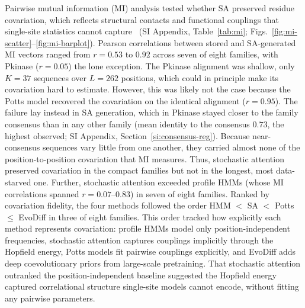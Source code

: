 Pairwise mutual information (MI) analysis tested whether SA preserved residue covariation, which reflects structural contacts and functional couplings that single-site statistics cannot capture~\cite{morcosDirectCouplingAnalysis2011} (SI Appendix, Table~\ref{tab:mi}; Figs.~\ref{fig:mi-scatter}--\ref{fig:mi-barplot}). Pearson correlations between stored and SA-generated MI vectors ranged from $r{=}0.53$ to $0.92$ across seven of eight families, with Pkinase ($r{=}0.05$) the lone exception. The Pkinase alignment was shallow, only $K{=}37$ sequences over $L{=}262$ positions, which could in principle make its covariation hard to estimate. However, this was likely not the case because the Potts model recovered the covariation on the identical alignment ($r{=}0.95$). The failure lay instead in SA generation, which in Pkinase stayed closer to the family consensus than in any other family (mean identity to the consensus $0.73$, the highest observed; SI Appendix, Section~\ref{si:consensus-reg}). Because near-consensus sequences vary little from one another, they carried almost none of the position-to-position covariation that MI measures. Thus, stochastic attention preserved covariation in the compact families but not in the longest, most data-starved one. Further, stochastic attention exceeded profile HMMs (whose MI correlations spanned $r{=}0.07$--$0.83$) in seven of eight families. Ranked by covariation fidelity, the four methods followed the order HMM $<$ SA $<$ Potts $\leq$ EvoDiff in three of eight families. This order tracked how explicitly each method represents covariation: profile HMMs model only position-independent frequencies, stochastic attention captures couplings implicitly through the Hopfield energy, Potts models fit pairwise couplings explicitly, and EvoDiff adds deep coevolutionary priors from large-scale pretraining. That stochastic attention outranked the position-independent baseline suggested the Hopfield energy captured correlational structure single-site models cannot encode, without fitting any pairwise parameters.

